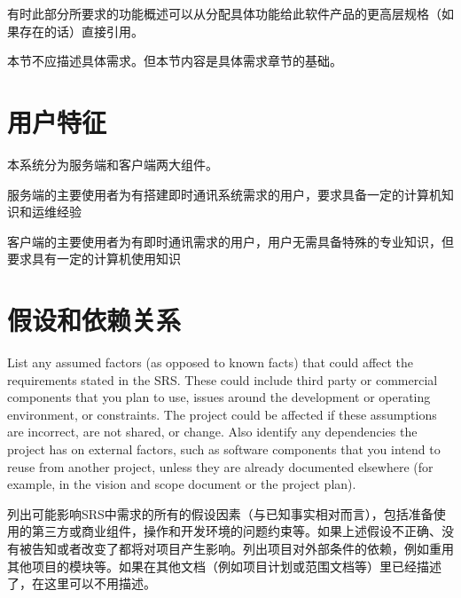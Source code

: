 有时此部分所要求的功能概述可以从分配具体功能给此软件产品的更高层规格（如果存在的话）直接引用。

本节不应描述具体需求。但本节内容是具体需求章节的基础。

\section{用户特征}
%
%

本系统分为服务端和客户端两大组件。

服务端的主要使用者为有搭建即时通讯系统需求的用户，要求具备一定的计算机知识和运维经验

客户端的主要使用者为有即时通讯需求的用户，用户无需具备特殊的专业知识，但要求具有一定的计算机使用知识

\section{假设和依赖关系}
List any assumed factors (as opposed to known facts) that could affect the requirements stated in the SRS. These could include third party or commercial components that you plan to use, issues around the development or operating environment, or constraints. The project could be affected if these assumptions are incorrect, are not shared, or change. Also identify any dependencies the project has on external factors, such as software components that you intend to reuse from another project, unless they are already documented elsewhere (for example, in the vision and scope document or the project plan). 

列出可能影响SRS中需求的所有的假设因素（与已知事实相对而言），包括准备使用的第三方或商业组件，操作和开发环境的问题约束等。如果上述假设不正确、没有被告知或者改变了都将对项目产生影响。列出项目对外部条件的依赖，例如重用其他项目的模块等。如果在其他文档（例如项目计划或范围文档等）里已经描述了，在这里可以不用描述。
